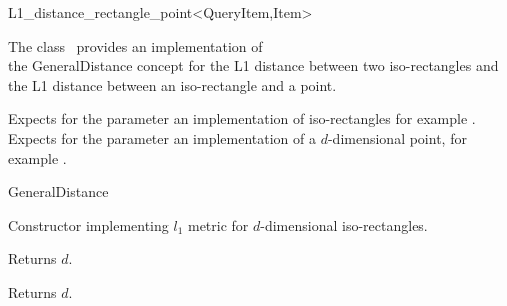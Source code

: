 

\begin{ccRefClass}{L1_distance_rectangle_point<QueryItem,Item>}  %


\ccDefinition

The class \ccRefName\ provides an implementation of \\
the GeneralDistance concept
for the L1 distance between two iso-rectangles and the L1 distance between an iso-rectangle
and a point.


\ccParameters

Expects for the parameter 
 an implementation of iso-rectangles
for example .
Expects for the parameter  an implementation
of a $d$-dimensional point, for example .

\ccIsModel

GeneralDistance

\ccTypes


\ccCreation
{}  %


{Constructor implementing $l_1$ metric for
$d$-dimensional iso-rectangles.}


 {Returns $d$.}

 {Returns $d$.}


\end{ccRefClass}

